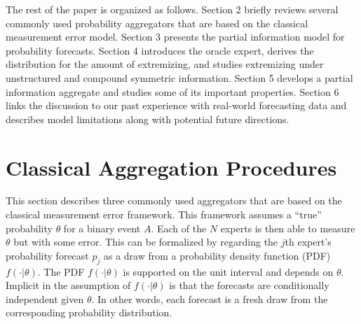 \documentclass[11pt]{article}
\theoremstyle{definition}
\theoremstyle{definition}
\begin{document}
 
 
 












The rest of the paper is organized as follows. Section 2 briefly reviews several commonly used probability aggregators that are based on the classical measurement error model. Section 3 presents the partial information model for probability forecasts. Section 4 introduces the oracle expert, derives the distribution for the amount of extremizing, and studies extremizing under unstructured and compound symmetric information. Section 5 develops a partial information aggregate and studies some of its important properties. Section 6 links the discussion to our past experience with real-world forecasting data and describes model limitations along with potential future directions. 


\section{Classical Aggregation Procedures}
This section describes three commonly used aggregators that are based on the classical measurement error framework. This framework assumes a ``true'' probability $\theta$ for a binary event $A$. Each of the $N$  experts is then able to measure $\theta$ but with some error. This can be formalized by regarding the $j$th expert's probability forecast $p_j$ as a draw from a probability density function (PDF) $f(\cdot | \theta)$. The PDF $f(\cdot | \theta)$ is supported on the unit interval and depends on $\theta$. Implicit in the assumption of $f(\cdot | \theta)$ is that the forecasts are conditionally independent given $\theta$. In other words, each forecast is a fresh draw from the corresponding probability distribution. 
\end{document}
